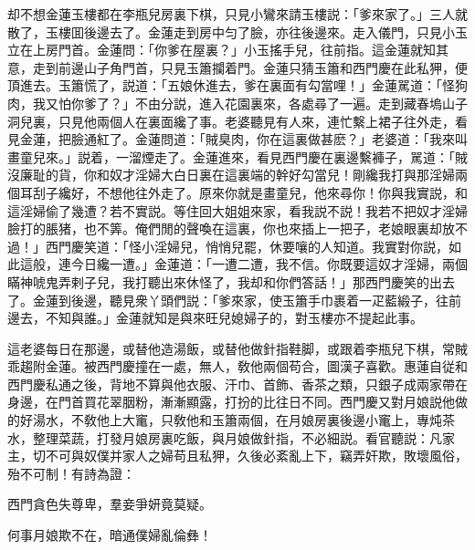 却不想金蓮玉樓都在李瓶兒房裏下棋，只見小鸞來請玉樓説：「爹來家了。」三人就散了，玉樓囬後邊去了。金蓮走到房中匀了臉，亦往後邊來。走入儀門，只見小玉立在上房門首。金蓮問：「你爹在屋裏？」小玉搖手兒，往前指。這金蓮就知其意，走到前邊山子角門首，只見玉簫攔着門。金蓮只猜玉簫和西門慶在此私狎，便頂進去。玉簫慌了，説道：「五娘休進去，爹在裏面有勾當哩！」金蓮駡道：「怪狗肉，我又怕你爹了？」不由分説，進入花園裏來，各處尋了一遍。走到藏春塢山子洞兒裏，只見他兩個人在裏面纔了事。老婆聽見有人來，連忙繫上裙子往外走，看見金蓮，把臉通紅了。金蓮問道：「賊臭肉，你在這裏做甚麽？」老婆道：「我來叫畫童兒來。」説着，一溜煙走了。金蓮進來，看見西門慶在裏邊繫褲子，駡道：「賊沒廉耻的貨，你和奴才淫婦大白日裏在這裏端的幹好勾當兒！剛纔我打與那淫婦兩個耳刮子纔好，不想他往外走了。原來你就是畫童兒，他來尋你！你與我實説，和這淫婦偷了幾遭？若不實説。等住回大姐姐來家，看我説不説！我若不把奴才淫婦臉打的脹猪，也不筭。俺們閒的聲喚在這裏，你也來插上一把子，老娘眼裏却放不過！」西門慶笑道：「怪小淫婦兒，悄悄兒罷，休要嚷的人知道。我實對你説，如此這般，連今日纔一遭。」金蓮道：「一遭二遭，我不信。你既要這奴才淫婦，兩個瞞神唬鬼弄剌子兒，我打聽出來休怪了，我却和你們答話！」那西門慶笑的出去了。金蓮到後邊，聽見衆丫頭們説：「爹來家，使玉簫手巾裹着一疋藍緞子，往前邊去，不知與誰。」金蓮就知是與來旺兒媳婦子的，對玉樓亦不提起此事。

這老婆每日在那邊，或替他造湯飯，或替他做針指鞋脚，或跟着李瓶兒下棋，常賊乖趨附金蓮。被西門慶撞在一處，無人，敎他兩個苟合，圖漢子喜歡。惠蓮自従和西門慶私通之後，背地不算與他衣服、汗巾、首飾、香茶之類，只銀子成兩家帶在身邊，在門首買花翠胭粉，漸漸顯露，打扮的比往日不同。西門慶又對月娘説他做的好湯水，不敎他上大竃，只敎他和玉簫兩個，在月娘房裏後邊小竃上，專炖茶水，整理菜蔬，打發月娘房裏吃飯，與月娘做針指，不必細説。看官聽説：凡家主，切不可與奴僕并家人之婦苟且私狎，久後必紊亂上下，竊弄奸欺，敗壞風俗，殆不可制！有詩為證：

西門貪色失尊卑，羣妾爭妍竟莫疑。

何事月娘欺不在，暗通僕婦亂倫彝！

